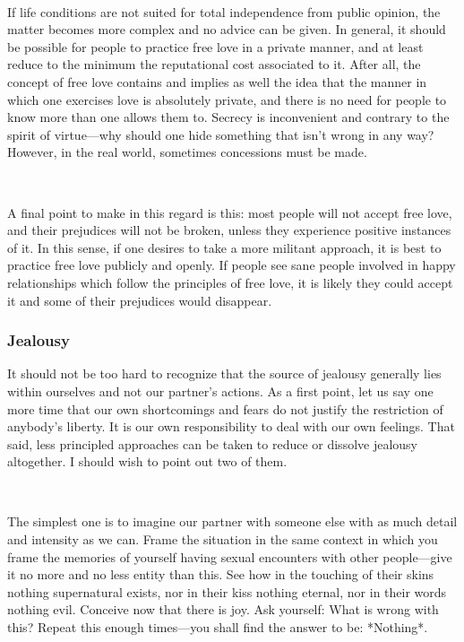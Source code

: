 \documentclass[a4paper, 12pt]{article}
\begin{document}
~ 

If life conditions are not suited for total independence from public opinion,
the matter becomes more complex and no advice can be given. In general, it
should be possible for people to practice free love in a private manner, and at
least reduce to the minimum the reputational cost associated to it. After all,
the concept of free love contains and implies as well the idea that the manner
in which one exercises love is absolutely private, and there is no need for
people to know more than one allows them to. Secrecy is inconvenient and
contrary to the spirit of virtue---why should one hide something that isn't
wrong in any way? However, in the real world, sometimes concessions must be
made.

~ 

A final point to make in this regard is this: most people will not accept free
love, and their prejudices will not be broken, unless they experience positive 
instances of it. In this sense, if one desires to take a more militant approach,
it is best to practice free love publicly and openly. If people see sane people 
involved in happy relationships which follow the principles of free love, it is 
likely they could accept it and some of their prejudices would disappear.

\subsubsection{Jealousy}

It should not be too hard to recognize that the source of jealousy generally
lies within ourselves and not our partner's actions. As a first point, let us
say one more time that our own shortcomings and fears do not justify the
restriction of anybody's liberty. It is our own responsibility to deal with our
own feelings. That said, less principled approaches can be taken to reduce or
dissolve jealousy altogether. I should wish to point out two of them.

~


The simplest one is to imagine our partner with someone else with as much
detail and intensity as we can. Frame the situation in the same context in
which you frame the memories of yourself having sexual encounters with other
people—give it no more and no less entity than this. See how in the touching of
their skins nothing supernatural exists, nor in their kiss nothing eternal, nor
in their words nothing evil. Conceive now that there is joy. Ask yourself: What
is wrong with this? Repeat this enough times—you shall find the answer to be:
*Nothing*. 
\end{document}

